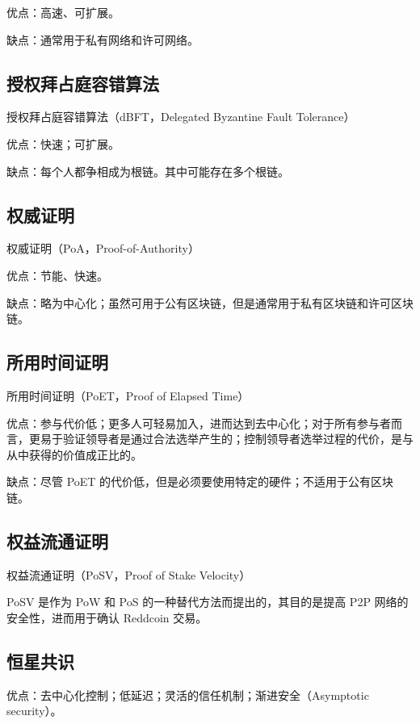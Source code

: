 优点：高速、可扩展。

缺点：通常用于私有网络和许可网络。

\subsection{授权拜占庭容错算法}

授权拜占庭容错算法（dBFT，Delegated Byzantine Fault Tolerance）

优点：快速；可扩展。

缺点：每个人都争相成为根链。其中可能存在多个根链。

\subsection{权威证明}

权威证明（PoA，Proof-of-Authority）

优点：节能、快速。

缺点：略为中心化；虽然可用于公有区块链，但是通常用于私有区块链和许可区块链。

\subsection{所用时间证明}

所用时间证明（PoET，Proof of Elapsed Time）

优点：参与代价低；更多人可轻易加入，进而达到去中心化；对于所有参与者而言，更易于验证领导者是通过合法选举产生的；控制领导者选举过程的代价，是与从中获得的价值成正比的。

缺点：尽管 PoET 的代价低，但是必须要使用特定的硬件；不适用于公有区块链。

\subsection{权益流通证明}

权益流通证明（PoSV，Proof of Stake Velocity）

PoSV 是作为 PoW 和 PoS 的一种替代方法而提出的，其目的是提高 P2P 网络的安全性，进而用于确认 Reddcoin 交易。

\subsection{恒星共识}

优点：去中心化控制；低延迟；灵活的信任机制；渐进安全（Asymptotic security）。
